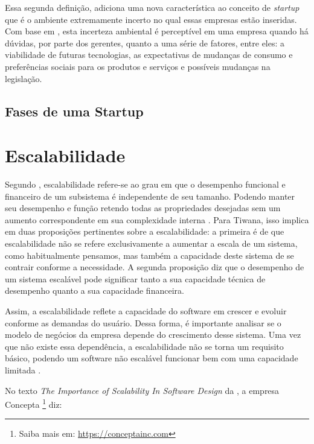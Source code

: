 Essa segunda definição, adiciona uma nova característica ao conceito de
\textit{startup} que é o ambiente extremamente incerto no qual essas empresas
estão inseridas. Com base em  , esta incerteza
ambiental é perceptível em uma empresa quando há dúvidas, por parte dos gerentes,
quanto a uma série de fatores, entre eles: a viabilidade de futuras tecnologias,
as expectativas de mudanças de consumo e preferências sociais para os produtos
e serviços e possíveis mudanças na legislação.

\subsection{Fases de uma Startup}

\section{Escalabilidade}

Segundo , escalabilidade refere-se ao grau em que
o desempenho funcional e financeiro de um subsistema é independente de seu tamanho.
Podendo manter seu desempenho e função retendo todas as propriedades desejadas sem
um aumento correspondente em sua complexidade interna
. Para Tiwana, isso implica em duas
proposições pertinentes sobre a escalabilidade: a primeira é de que escalabilidade não
se refere exclusivamente a aumentar a escala de um sistema, como habitualmente
pensamos, mas também a capacidade deste sistema de se contrair conforme a necessidade.
A segunda proposição diz que o desempenho de um sistema escalável pode significar
tanto a sua capacidade técnica de desempenho quanto a sua capacidade financeira.

Assim, a escalabilidade reflete a capacidade do software em crescer e evoluir
conforme as demandas do usuário. Dessa forma, é importante analisar se o
modelo de negócios da empresa depende do crescimento desse sistema. Uma vez que
não existe essa dependência, a escalabilidade não se torna um requisito básico,
podendo um software não escalável funcionar bem com uma capacidade limitada
\cite{ConceptaScalability}.

No texto \textit{The Importance of Scalability In Software Design}
da , a empresa Concepta
\footnote{Saiba mais em: \url{https://conceptainc.com}} diz:

